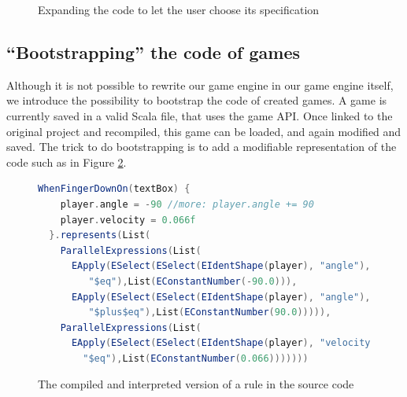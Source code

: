 \documentclass[12pt]{article} %
\begin{document}
\begin{figure}
\centering
{}
\caption{Expanding the code to let the user choose its
specification\label{ifthenelse}}
\end{figure}

\subsection{``Bootstrapping'' the code of games}

Although it is not possible to rewrite our game engine in our game
engine itself, we introduce the possibility to bootstrap the code of
created games. A game is currently saved in a valid Scala file, that uses the
game API. Once linked to the original project and recompiled, this game can be
loaded, and again modified and saved.
The trick to do bootstrapping is to add a modifiable representation of the
code such as in Figure \ref{recompiledCode}.

\begin{figure}
\begin{lstlisting}[language=scala]
WhenFingerDownOn(textBox) {
    player.angle = -90 //more: player.angle += 90
    player.velocity = 0.066f
  }.represents(List(
    ParallelExpressions(List(
      EApply(ESelect(ESelect(EIdentShape(player), "angle"),
         "$eq"),List(EConstantNumber(-90.0))),
      EApply(ESelect(ESelect(EIdentShape(player), "angle"),
         "$plus$eq"),List(EConstantNumber(90.0))))),
    ParallelExpressions(List(
      EApply(ESelect(ESelect(EIdentShape(player), "velocity"),
        "$eq"),List(EConstantNumber(0.066)))))))
\end{lstlisting}
\caption{The compiled and interpreted version of a
rule in the source code\label{recompiledCode}}
\end{figure}
\end{document}
